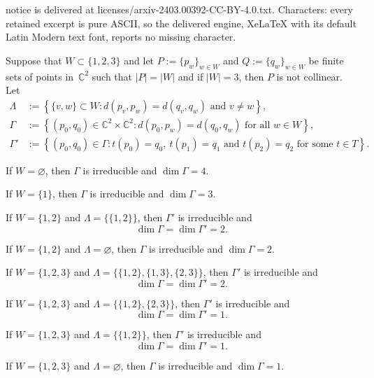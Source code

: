 \documentclass[10pt,a4paper]{amsart}
\newcommand{\C}{{\mathbb{C}}}
\newcommand{\sd}{d} %
\newcommand{\set}[2]{\left\{#1:#2\right\}}
\newcommand{\st}{such that }
\begin{document}
notice is delivered at licenses/arxiv-2403.00392-CC-BY-4.0.txt. Characters: every retained excerpt is pure ASCII, so the delivered engine, XeLaTeX with its default Latin Modern text font, reports no missing character.
\begin{lemma}
\label{lem:fib}
Suppose that $W\subset\{1,2,3\}$ and let $P:=\{p_w\}_{w\in W}$ and $Q:=\{q_w\}_{w\in W}$
be finite sets of points in~$\C^2$ \st $|P|=|W|$ and if $|W|=3$, then $P$ is not collinear.
Let
\begin{align*}
\Lambda     &:=\set{\{v,w\}\subset W}{\sd(p_v,p_w)=\sd(q_v,q_w) \text{ and }v\neq w},\\
\Gamma&:=\set{(p_0,q_0)\in\C^2\times\C^2}{\sd(p_0,p_w)=\sd(q_0,q_w) \text{ for all } w\in W},\\
\Gamma'&:=\set{(p_0,q_0)\in \Gamma}{t(p_0)=q_0,~ t(p_1)=q_1 \text{ and } t(p_2)=q_2 \text{ for some }t\in T}.
\end{align*}
\begin{claims}
\item\label{lem:fib:a}
If $W=\varnothing$,
then $\Gamma$ is irreducible and $\dim \Gamma=4$.
\item\label{lem:fib:b}
If $W=\{1\}$,
then $\Gamma$ is irreducible and $\dim \Gamma=3$.
\item\label{lem:fib:c}
If $W=\{1,2\}$ and $\Lambda=\{\{1,2\}\}$,
then $\Gamma'$ is irreducible and
\[
\dim \Gamma=\dim\Gamma'=2.
\]
\item\label{lem:fib:d}
If $W=\{1,2\}$ and $\Lambda=\varnothing$, then $\Gamma$ is irreducible and $\dim \Gamma=2$.
\item\label{lem:fib:e}
If $W=\{1,2,3\}$ and $\Lambda=\{\{1,2\},\{1,3\},\{2,3\}\}$,
then $\Gamma'$ is irreducible and
\[
\dim \Gamma=\dim\Gamma'=2.
\]
\item\label{lem:fib:f}
If $W=\{1,2,3\}$ and $\Lambda=\{\{1,2\},\{2,3\}\}$,
then $\Gamma'$ is irreducible and
\[
\dim \Gamma=\dim\Gamma'=1.
\]
\item\label{lem:fib:g}
If $W=\{1,2,3\}$ and $\Lambda=\{\{1,2\}\}$,
then $\Gamma'$ is irreducible and
\[
\dim \Gamma=\dim\Gamma'=1.
\]
\item\label{lem:fib:h}
If $W=\{1,2,3\}$ and $\Lambda=\varnothing$,
then $\Gamma$ is irreducible and $\dim \Gamma=1$.
\end{claims}
\end{lemma}
\end{document}

